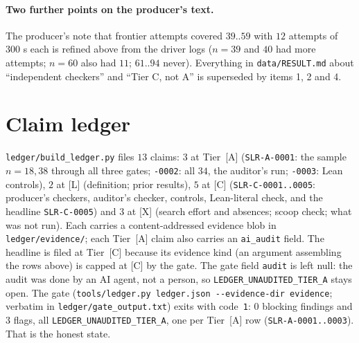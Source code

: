 \documentclass[10pt]{article}
\newcommand{\tier}[1]{\textsf{[#1]}}
\newcommand{\tA}{\tier{A}}
\newcommand{\tL}{\tier{L}}
\newcommand{\tC}{\tier{C}}
\newcommand{\tX}{\tier{X}}
\begin{document}
\paragraph{Two further points on the producer's text.} The producer's note that frontier attempts covered $39..59$ with $12$ attempts of $300$ s each is refined above from the driver logs ($n=39$ and $40$ had more attempts; $n=60$ also had $11$; $61..94$ never). Everything in \texttt{data/RESULT.md} about ``independent checkers'' and ``Tier C, not A'' is superseded by items 1, 2 and 4.

\section{Claim ledger}\label{sec:ledger}
\texttt{ledger/build\_ledger.py} files $13$ claims: $3$ at Tier~\tA{} (\texttt{SLR-A-0001}: the sample $n=18,38$ through all three gates; \texttt{-0002}: all $34$, the auditor's run; \texttt{-0003}: Lean controls), $2$ at \tL{} (definition; prior results), $5$ at \tC{} (\texttt{SLR-C-0001..0005}: producer's checkers, auditor's checker, controls, Lean-literal check, and the headline \texttt{SLR-C-0005}) and $3$ at \tX{} (search effort and absences; scoop check; what was not run). Each carries a content-addressed evidence blob in \texttt{ledger/evidence/}; each Tier~\tA{} claim also carries an \texttt{ai\_audit} field. The headline is filed at Tier~\tC{} because its evidence kind (an argument assembling the rows above) is capped at \tC{} by the gate. The gate field \texttt{audit} is left null: the audit was done by an AI agent, not a person, so \texttt{LEDGER\_UNAUDITED\_TIER\_A} stays open. The gate (\texttt{tools/ledger.py ledger.json -{}-evidence-dir evidence}; verbatim in \texttt{ledger/gate\_output.txt}) exits with code~\texttt{1}: $0$ blocking findings and $3$ flags, all \texttt{LEDGER\_UNAUDITED\_TIER\_A}, one per Tier~\tA{} row (\texttt{SLR-A-0001..0003}). That is the honest state.

\end{document}
